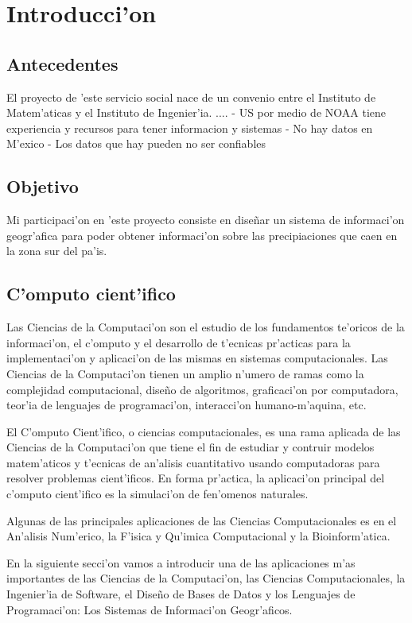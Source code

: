 \chapter{Introducci'on}
\section{Antecedentes}
El proyecto de 'este servicio social nace de un convenio entre el Instituto de Matem'aticas y el Instituto de Ingenier'ia.
....
- US por medio de NOAA tiene experiencia y recursos para tener informacion y sistemas
- No hay datos en M'exico
- Los datos que hay pueden no ser confiables

\section{Objetivo}
Mi participaci'on en 'este proyecto consiste en dise\~nar un sistema de informaci'on geogr'afica para poder obtener
 informaci'on sobre las precipiaciones que caen en la zona sur del pa'is.

\section{C'omputo cient'ifico}

Las Ciencias de la Computaci'on son el estudio de los fundamentos te'oricos de la informaci'on, el c'omputo y el 
desarrollo de t'ecnicas pr'acticas para la implementaci'on y aplicaci'on de las mismas en sistemas computacionales.
Las Ciencias de la Computaci'on tienen un amplio n'umero de ramas como la complejidad computacional, dise\~no de algoritmos,
graficaci'on por computadora, teor'ia de lenguajes de programaci'on, interacci'on humano-m'aquina, etc.

El C'omputo Cient'ifico, o ciencias computacionales, es una rama aplicada de las Ciencias de la Computaci'on 
que tiene el fin de estudiar y contruir modelos 
matem'aticos y t'ecnicas de an'alisis cuantitativo usando computadoras para resolver problemas cient'ificos. En forma
pr'actica, la aplicaci'on principal del c'omputo cient'ifico es la simulaci'on de fen'omenos naturales.

Algunas de las principales aplicaciones de las Ciencias Computacionales es en el An'alisis Num'erico, la F'isica y Qu'imica
Computacional y la Bioinform'atica.


En la siguiente secci'on vamos a introducir una de las aplicaciones m'as importantes de las Ciencias de la Computaci'on, las Ciencias Computacionales, la Ingenier'ia de Software, 
el Diseño de Bases de Datos y los Lenguajes de Programaci'on: 
Los Sistemas de Informaci'on Geogr'aficos.


